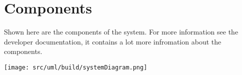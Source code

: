 \author{Tadd\"aus Nauheimer}

\chapter{Components}

Shown here are the components of the system.
For more information see the developer documentation, it contains a lot more infromation about the components.

\texttt{[image: src/uml/build/systemDiagram.png]}
